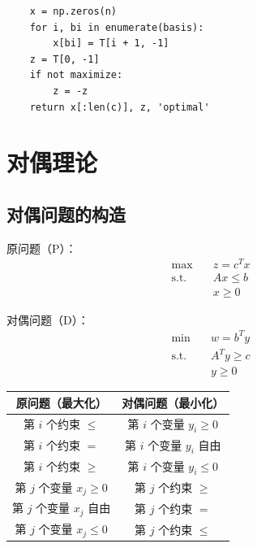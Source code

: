 \begin{codebox}[两阶段法实现]
\begin{lstlisting}
    x = np.zeros(n)
    for i, bi in enumerate(basis):
        x[bi] = T[i + 1, -1]
    z = T[0, -1]
    if not maximize:
        z = -z
    return x[:len(c)], z, 'optimal'
\end{lstlisting}
\end{codebox}

\section{对偶理论}\label{sec:ch2-duality}

\subsection{对偶问题的构造}

\begin{theorem}[对称形式的对偶]
原问题（P）：
\begin{align*}
\max \quad & z = c^T x \\
\text{s.t.} \quad & Ax \leq b \\
& x \geq 0
\end{align*}

对偶问题（D）：
\begin{align*}
\min \quad & w = b^T y \\
\text{s.t.} \quad & A^T y \geq c \\
& y \geq 0
\end{align*}
\end{theorem}

\begin{conceptbox}[原问题与对偶问题的对应关系]
\begin{table}[H]
\centering
\begin{tabular}{@{}cc@{}}
\toprule
\textbf{原问题（最大化）} & \textbf{对偶问题（最小化）} \\
\midrule
第 $i$ 个约束 $\leq$ & 第 $i$ 个变量 $y_i \geq 0$ \\
第 $i$ 个约束 $=$ & 第 $i$ 个变量 $y_i$ 自由 \\
第 $i$ 个约束 $\geq$ & 第 $i$ 个变量 $y_i \leq 0$ \\
\midrule
第 $j$ 个变量 $x_j \geq 0$ & 第 $j$ 个约束 $\geq$ \\
第 $j$ 个变量 $x_j$ 自由 & 第 $j$ 个约束 $=$ \\
第 $j$ 个变量 $x_j \leq 0$ & 第 $j$ 个约束 $\leq$ \\
\bottomrule
\end{tabular}
\end{table}
\end{conceptbox}

